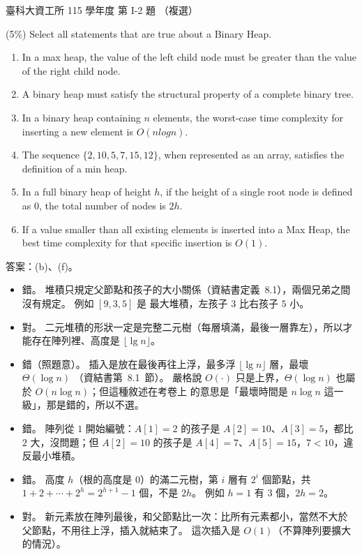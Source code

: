 \begin{pastexam}[label={px:ntust-115-ice-02}]{臺科大資工所 115 學年度 第 I-2 題}
（複選）

(5\%) Select all statements that are true about a Binary Heap.
\begin{enumerate}[label=(\alph*)]
\item In a max heap, the value of the left child node must be greater than the value of the right child
node.
\item A binary heap must satisfy the structural property of a complete binary tree.
\item In a binary heap containing $n$ elements, the worst-case time complexity for inserting a new element
is $O(nlogn)$.
\item The sequence $\{2,10,5,7,15,12\}$, when represented as an array, satisfies the definition of a min
heap.
\item In a full binary heap of height $h$, if the height of a single root node is defined as $0$, the total
number of nodes is $2h$.
\item If a value smaller than all existing elements is inserted into a Max Heap, the best time complexity
for that specific insertion is $O(1)$.
\end{enumerate}
\end{pastexam}

\begin{pastsoln}
答案：(b)、(f)。

\begin{itemize}
\item[(a)] 錯。 堆積只規定父節點和孩子的大小關係（資結書定義~8.1），兩個兄弟之間沒有規定。 例如 $[9, 3, 5]$ 是
最大堆積，左孩子 $3$ 比右孩子 $5$ 小。
\item[(b)] 對。 二元堆積的形狀一定是完整二元樹（每層填滿，最後一層靠左），所以才能存在陣列裡、高度是
$\lfloor \lg n \rfloor$。
\item[(c)] 錯（照題意）。 插入是放在最後再往上浮，最多浮 $\lfloor \lg n \rfloor$ 層，最壞 $\Theta(\log n)$
（資結書第~8.1~節）。 嚴格說 $O(\cdot)$ 只是上界，$\Theta(\log n)$ 也屬於 $O(n \log n)$；但這種敘述在考卷上
的意思是「最壞時間是 $n \log n$ 這一級」，那是錯的，所以不選。
\item[(d)] 錯。 陣列從 $1$ 開始編號：$A[1] = 2$ 的孩子是 $A[2] = 10$、$A[3] = 5$，都比 $2$ 大，沒問題；但
$A[2] = 10$ 的孩子是 $A[4] = 7$、$A[5] = 15$，$7 < 10$，違反最小堆積。
\item[(e)] 錯。 高度 $h$（根的高度是 $0$）的滿二元樹，第 $i$ 層有 $2^i$ 個節點，共
$1 + 2 + \cdots + 2^h = 2^{h+1} - 1$ 個，不是 $2h$。 例如 $h = 1$ 有 $3$ 個，$2h = 2$。
\item[(f)] 對。 新元素放在陣列最後，和父節點比一次：比所有元素都小，當然不大於父節點，不用往上浮，插入就結束了。
這次插入是 $O(1)$（不算陣列要擴大的情況）。
\end{itemize}
\end{pastsoln}
